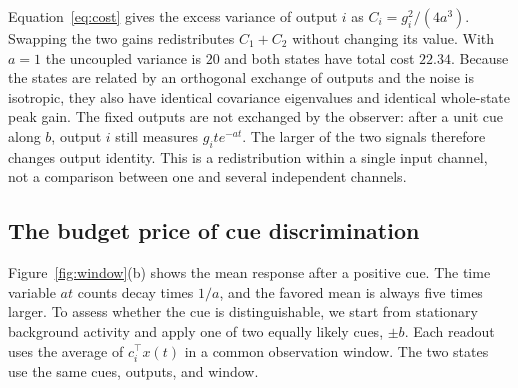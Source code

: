\documentclass[aps,10pt,onecolumn,superscriptaddress,nofootinbib,longbibliography,
  amsmath,amssymb,floatfix]{revtex4-2}
\begin{document}
Equation~\eqref{eq:cost} gives the excess variance of output \(i\)
as \(C_i=g_i^2/(4a^3)\). Swapping the two gains redistributes
\(C_1+C_2\) without changing its value. With \(a=1\) the uncoupled
variance is \(20\) and both states have total cost \(22.34\).
Because the states are related by an orthogonal exchange of
outputs and the noise is isotropic, they also have identical
covariance eigenvalues and identical whole-state peak gain. The
fixed outputs are not exchanged by the observer: after a unit cue
along \(b\), output \(i\) still measures \(g_i t e^{-at}\).
The larger of the two signals therefore changes output identity.
This is a redistribution within a single input channel, not a
comparison between one and several independent channels.

\subsection{The budget price of cue discrimination}

Figure~\ref{fig:window}(b) shows the mean response after a positive
cue. The time variable \(at\) counts decay times \(1/a\), and the
favored mean is always five times larger. To assess whether the cue is
distinguishable, we start from stationary background activity
and apply one of two equally likely cues, \(\pm b\). Each readout
uses the average of \(c_i^\top x(t)\) in a common observation
window. The two states use the same cues, outputs, and window.
\end{document}
